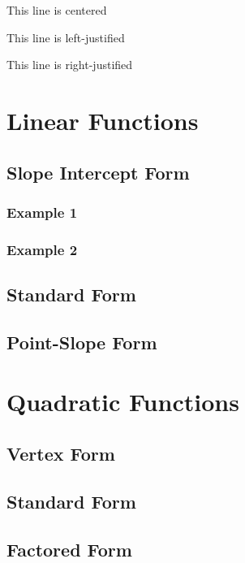 \documentclass[11pt]{article}
\begin{document}
\tiny
This line is centered

This line is left-justified

This line is right-justified

\vspace{0.5cm}

\section{Linear Functions}
\subsection{Slope Intercept Form}
\subsubsection{Example 1}
\subsubsection{Example 2}
\subsection{Standard Form}
\subsection{Point-Slope Form}

\section{Quadratic Functions}
\subsection{Vertex Form}
\subsection{Standard Form}
\subsection{Factored Form}
\end{document}
